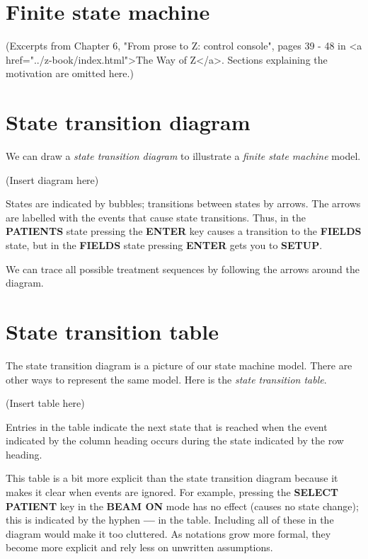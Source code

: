
\section*{Finite state machine}

(Excerpts from Chapter 6, "From prose to Z: control console", pages
39 - 48 in <a href="../z-book/index.html">The Way of Z</a>.  Sections
explaining the motivation are omitted here.)

\section*{State transition diagram}

We can draw a {\em state transition diagram} to illustrate 
a {\em finite state machine} model.

(Insert diagram here)

States are indicated by bubbles; transitions between states by arrows.
The arrows are labelled with the events that cause state transitions.
Thus, in the {\bf PATIENTS} state pressing the {\bf ENTER} key causes
a transition to the {\bf FIELDS} state, but in the {\bf FIELDS} state
pressing {\bf ENTER} gets you to {\bf SETUP}.

We can trace all possible treatment sequences by
following the arrows around the diagram. 

\section*{State transition table}

The state transition diagram is a picture of our state machine model.
There are other ways to represent the same model.  
Here is the {\em state transition table}.  

(Insert table here)

Entries in the table indicate
the next state that is reached when the event indicated by the column
heading occurs during the state indicated by the row heading.

This table is a bit more explicit than the state transition diagram because
it makes it clear when events are ignored.  For example, pressing the
{\bf SELECT PATIENT} key in the {\bf BEAM ON} mode has no effect 
(causes no state
change); this is indicated by the hyphen {\bf ---} in the table.  Including
all of these in the diagram would make it too cluttered.  As notations grow
more formal, they become more explicit and rely less on unwritten
assumptions.

